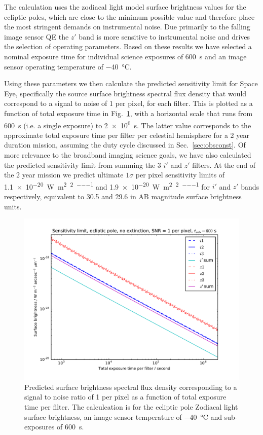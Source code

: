 \documentclass[]{iac}
\begin{document}
The calculation uses the zodiacal light model surface brightness values for the ecliptic poles, which are close to the
minimum possible value and therefore place the most stringent demands on instrumental noise. Due primarily to the
falling image sensor QE the $z'$ band is more sensitive to instrumental noise and drives the selection of operating
parameters. Based on these results we have selected a nominal exposure time for individual science exposures of
\SI{600}{\second} and an image sensor operating temperature of \SI{-40}{\celsius}.

Using these parameters we then calculate the predicted sensitivity limit for Space Eye, specifically the source surface
brightness spectral flux density that would correspond to a signal to noise of 1 per pixel, for each filter. This is
plotted as a function of total exposure time in Fig.~\ref{fig:sens}, with a horizontal scale that runs from
\SI{600}{\second} (i.e. a single exposure) to \SI{2e6}{\second}. The latter value corresponds to the approximate total
exposure time per filter per celestial hemisphere for a 2 year duration mission, assuming the duty cycle discussed in
Sec.~\ref{sec:obsconst}. Of more relevance to the broadband imaging science goals, we have also calculated the predicted
sensitivity limit from summing the 3 $i'$ and $z'$ filters. At the end of the 2 year mission we predict ultimate
$1\sigma$ per pixel sensitivity limits of \SI{1.1e-20}{\watt\per\metre\squared\per\tarcsecond\squared\per\micron} and
\SI{1.9e-20}{\watt\per\metre\squared\per\tarcsecond\squared\per\micron} for $i'$ and $z'$ bands respectively, equivalent
to 30.5 and 29.6 in AB magnitude surface brightness units.

\begin{figure}[htp]
  \center \includegraphics[width=\columnwidth]{figures/sens.pdf}
  \caption{\label{fig:sens}Predicted surface brightness spectral flux density corresponding to a signal to noise ratio
    of 1 per pixel as a function of total exposure time per filter. The calculcation is for the ecliptic pole Zodiacal
    light surface brightness, an image sensor temperature of \SI{-40}{\celsius} and sub-exposures of \SI{600}{\second}.}
\end{figure}
\end{document}
